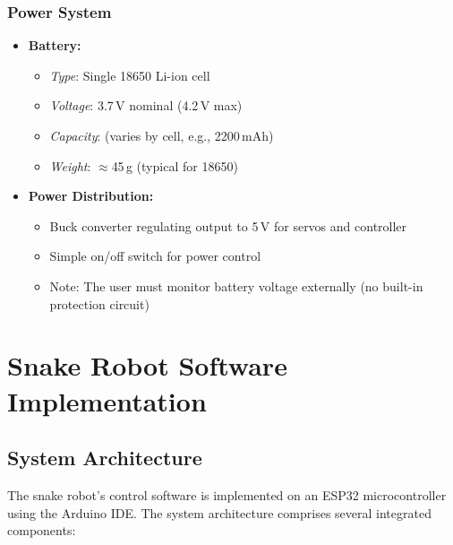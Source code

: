 \documentclass[12pt,a4paper]{report}
\begin{document}
\subsection{Power System}
\begin{itemize}
    \item \textbf{Battery:}
    \begin{itemize}
        \item \textit{Type}: Single 18650 Li-ion cell
        \item \textit{Voltage}: 3.7\,V nominal (4.2\,V max)
        \item \textit{Capacity}: (varies by cell, e.g., 2200\,mAh)
        \item \textit{Weight}: $\approx$45\,g (typical for 18650)
    \end{itemize}

    \item \textbf{Power Distribution:}
    \begin{itemize}
        \item Buck converter regulating output to 5\,V for servos and controller
        \item Simple on/off switch for power control
        \item Note: The user must monitor battery voltage externally (no built-in protection circuit)
    \end{itemize}
\end{itemize}

 

\chapter{Snake Robot Software Implementation}

\section{System Architecture}
The snake robot's control software is implemented on an ESP32 microcontroller using the Arduino IDE. The system architecture comprises several integrated components:
\end{document}
